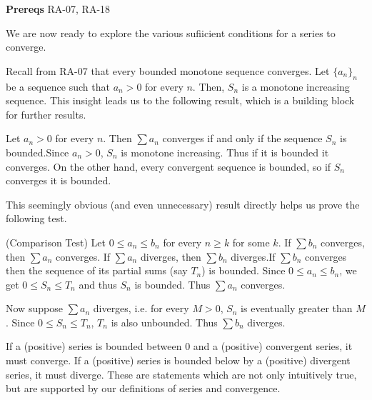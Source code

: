 

\textbf{Prereqs} RA-07, RA-18

We are now ready to explore the various sufiicient conditions for a series to converge.

Recall from RA-07 that every bounded monotone sequence converges. Let $\{a_n\}_n$ be a sequence such that $a_n > 0$ for every $n$. Then, $S_n$ is a monotone increasing sequence. This insight leads us to the following result, which is a building block for further results.

\begin{SWP}{\thm}{Let $a_n > 0$ for every $n$. Then $\sum a_n$ converges if and only if the sequence $S_n$ is bounded.}Since $a_n > 0$, $S_n$ is monotone increasing. Thus if it is bounded it converges. On the other hand, every convergent sequence is bounded, so if $S_n$ converges it is bounded.
\end{SWP}

This seemingly obvious (and even unnecessary) result directly helps us prove the following test.

\begin{SWP}{\thm}{(Comparison Test) Let $0 \leq a_n \leq b_n$ for every $n \geq k$ for some $k$. If $\sum b_n$ converges, then $\sum a_n$ converges. If $\sum a_n$ diverges, then $\sum b_n$ diverges.}If $\sum b_n$ converges then the sequence of its partial sums (say $T_n$) is bounded. Since $0 \leq a_n \leq b_n$, we get $0 \leq S_n \leq T_n$ and thus $S_n$ is bounded. Thus $\sum a_n$ converges.

Now suppose $\sum a_n$ diverges, i.e. for every $M > 0$, $S_n$ is eventually greater than $M$. Since $0 \leq S_n \leq T_n$, $T_n$ is also unbounded. Thus $\sum b_n$ diverges.
\end{SWP}

If a (positive) series is bounded between $0$ and a (positive) convergent series, it must converge. If a (positive) series is bounded below by a (positive) divergent series, it must diverge. These are statements which are not only intuitively true, but are supported by our definitions of series and convergence.

